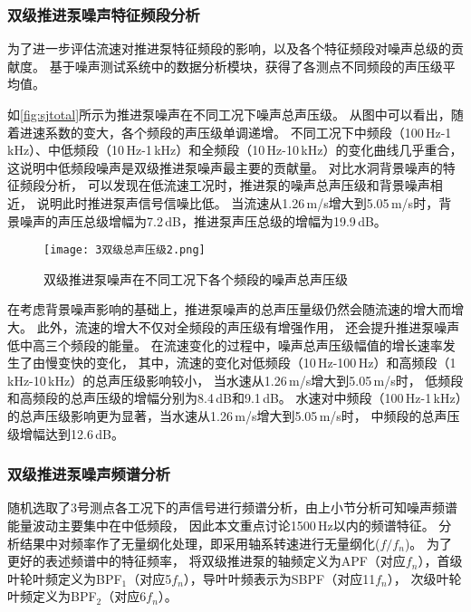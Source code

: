 \subsubsection{双级推进泵噪声特征频段分析}
为了进一步评估流速对推进泵特征频段的影响，以及各个特征频段对噪声总级的贡献度。
基于噪声测试系统中的数据分析模块，获得了各测点不同频段的声压级平均值。

如\autoref{fig:sjtotal}所示为推进泵噪声在不同工况下噪声总声压级。
从图中可以看出，随着进速系数的变大，各个频段的声压级单调递增。
不同工况下中频段（100\,Hz-1\,kHz）、中低频段（10\,Hz-1\,kHz）和全频段（10\,Hz-10\,kHz）的变化曲线几乎重合，
这说明中低频段噪声是双级推进泵噪声最主要的贡献量。
对比水洞背景噪声的特征频段分析，
可以发现在低流速工况时，推进泵的噪声总声压级和背景噪声相近，
说明此时推进泵声信号信噪比低。
当流速从1.26\,m/s增大到5.05\,m/s时，背景噪声的声压总级增幅为7.2\,dB，推进泵声压总级的增幅为19.9\,dB。
\begin{figure}[htbp]
    \centering
    \texttt{[image: 3双级总声压级2.png]}
    \caption{\label{fig:sjtotal}双级推进泵噪声在不同工况下各个频段的噪声总声压级}
\end{figure}

在考虑背景噪声影响的基础上，推进泵噪声的总声压量级仍然会随流速的增大而增大。
此外，流速的增大不仅对全频段的声压级有增强作用，
还会提升推进泵噪声低中高三个频段的能量。
在流速变化的过程中，噪声总声压级幅值的增长速率发生了由慢变快的变化，
其中，流速的变化对低频段（10\,Hz-100\,Hz）和高频段（1\,kHz-10\,kHz）的总声压级影响较小，
当水速从1.26\,m/s增大到5.05\,m/s时，
低频段和高频段的总声压级的增幅分别为8.4\,dB和9.1\,dB。
水速对中频段（100\,Hz-1\,kHz）的总声压级影响更为显著，当水速从1.26\,m/s增大到5.05\,m/s时，
中频段的总声压级增幅达到12.6\,dB。
\subsubsection{双级推进泵噪声频谱分析}
随机选取了3号测点各工况下的声信号进行频谱分析，由上小节分析可知噪声频谱能量波动主要集中在中低频段，
因此本文重点讨论1500\,Hz以内的频谱特征。
分析结果中对频率作了无量纲化处理，即采用轴系转速进行无量纲化($f/f_n$)。
为了更好的表述频谱中的特征频率，
将双级推进泵的轴频定义为APF（对应$f_n$），首级叶轮叶频定义为BPF$_1$（对应5$f_n$），导叶叶频表示为SBPF（对应11$f_n$），
次级叶轮叶频定义为BPF$_2$（对应6$f_n$）。

